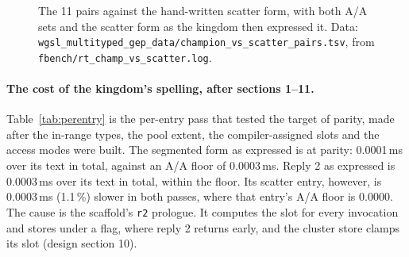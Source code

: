 \documentclass[sigconf,nonacm]{acmart}
\newcommand{\code}[1]{\nolinkurl{#1}}
\newcommand{\src}[1]{{\footnotesize\nolinkurl{#1}}}
\begin{document}
\begin{figure}[t]
\centering
{}
\pairs
{}
\caption{The 11 pairs against the hand-written scatter form, with both A/A sets
and the scatter form as the kingdom then expressed it. Data:
\src{wgsl_multityped_gep_data/champion_vs_scatter_pairs.tsv}, from
\src{fbench/rt_champ_vs_scatter.log}.}
\label{fig:pairs}
\end{figure}

\paragraph{The cost of the kingdom's spelling, after sections 1--11.}
Table~\ref{tab:perentry} is the per-entry pass that tested the target of
parity, made after the in-range types, the pool extent, the compiler-assigned
slots and the access modes were built. The segmented form as expressed is at
parity: 0.0001\,ms over its text in total, against an A/A floor of 0.0003\,ms.
Reply 2 as expressed is 0.0003\,ms over its text in total, within the floor.
Its scatter entry, however, is 0.0003\,ms (1.1\,\%) slower in both passes,
where that entry's A/A floor is 0.0000. The cause is the scaffold's \code{r2}
prologue. It computes the slot for every invocation and stores under a flag,
where reply 2 returns early, and the cluster store clamps its slot (design
section 10).
\end{document}
